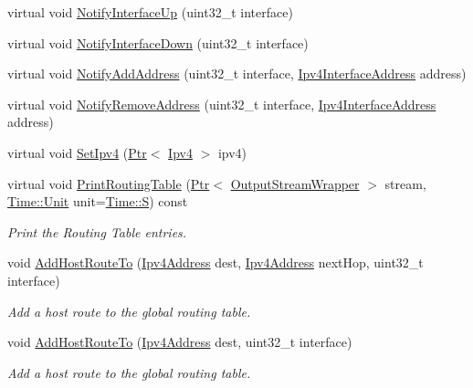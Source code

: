 \begin{DoxyCompactItemize}
virtual void \hyperlink{classns3_1_1Ipv4GlobalRouting_af4068bd0482d47a34ceb857ba2137c97}{Notify\+Interface\+Up} (uint32\+\_\+t interface)
\item 
virtual void \hyperlink{classns3_1_1Ipv4GlobalRouting_a15eb3f2522504b90c7fb28412040e1ff}{Notify\+Interface\+Down} (uint32\+\_\+t interface)
\item 
virtual void \hyperlink{classns3_1_1Ipv4GlobalRouting_a500c6e43cbf90b83b9582d3dc029ede0}{Notify\+Add\+Address} (uint32\+\_\+t interface, \hyperlink{classns3_1_1Ipv4InterfaceAddress}{Ipv4\+Interface\+Address} address)
\item 
virtual void \hyperlink{classns3_1_1Ipv4GlobalRouting_a2fe404417aaa31ac52fe87817075e612}{Notify\+Remove\+Address} (uint32\+\_\+t interface, \hyperlink{classns3_1_1Ipv4InterfaceAddress}{Ipv4\+Interface\+Address} address)
\item 
virtual void \hyperlink{classns3_1_1Ipv4GlobalRouting_a48499c4690b5699fd12aade2e236f214}{Set\+Ipv4} (\hyperlink{classns3_1_1Ptr}{Ptr}$<$ \hyperlink{classns3_1_1Ipv4}{Ipv4} $>$ ipv4)
\item 
virtual void \hyperlink{classns3_1_1Ipv4GlobalRouting_aa8be09f66df028d8c3832c1c0da25a7b}{Print\+Routing\+Table} (\hyperlink{classns3_1_1Ptr}{Ptr}$<$ \hyperlink{classns3_1_1OutputStreamWrapper}{Output\+Stream\+Wrapper} $>$ stream, \hyperlink{classns3_1_1Time_a87a7f4d29c68b047a72d291ad660295a}{Time\+::\+Unit} unit=\hyperlink{classns3_1_1Time_a87a7f4d29c68b047a72d291ad660295aade8622b06524a328cd3a59db6ccf76af}{Time\+::S}) const 
\begin{DoxyCompactList}\small\item\em Print the Routing Table entries. \end{DoxyCompactList}\item 
void \hyperlink{classns3_1_1Ipv4GlobalRouting_a10009a3ac337496cdef0260ad5b5c106}{Add\+Host\+Route\+To} (\hyperlink{classns3_1_1Ipv4Address}{Ipv4\+Address} dest, \hyperlink{classns3_1_1Ipv4Address}{Ipv4\+Address} next\+Hop, uint32\+\_\+t interface)
\begin{DoxyCompactList}\small\item\em Add a host route to the global routing table. \end{DoxyCompactList}\item 
void \hyperlink{classns3_1_1Ipv4GlobalRouting_a17caf38d32c60d9207e78abb9344d366}{Add\+Host\+Route\+To} (\hyperlink{classns3_1_1Ipv4Address}{Ipv4\+Address} dest, uint32\+\_\+t interface)
\begin{DoxyCompactList}\small\item\em Add a host route to the global routing table. \end{DoxyCompactList}\item 

\end{DoxyCompactItemize}
